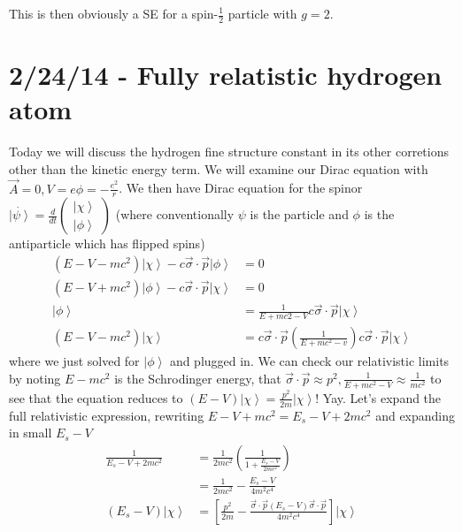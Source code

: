 \documentclass[10pt]{report}
\newcommand{\ket}[1]{\left|#1\right>}
\newcommand{\rd}[2]{\frac{d#1}{d#2}}
\begin{document}
This is then obviously a SE for a spin-$\frac{1}{2}$ particle with $g=2$. 

\chapter{2/24/14 - Fully relatistic hydrogen atom}

Today we will discuss the hydrogen fine structure constant in its other corretions other than the kinetic energy term. We will examine our Dirac equation with $\vec{A} = 0, V = e\phi = -\frac{e^2}{r}$. We then have Dirac equation for the spinor $\dot{\ket{\psi}} = \rd{}{t}\begin{pmatrix} \ket{\chi}\\ \ket{\phi} \end{pmatrix}$ (where conventionally $\psi$ is the particle and $\phi$ is the antiparticle which has flipped spins)
\begin{align}
    \left( E-V-mc^2 \right)\ket{\chi} - c\vec{\sigma}\cdot \vec{p}\ket{\phi} &= 0\\
    \left( E-V+mc^2 \right)\ket{\phi} - c\vec{\sigma}\cdot \vec{p}\ket{\chi} &= 0\\
    \ket{\phi} &= \frac{1}{E + mc2 - V}c\vec{\sigma}\cdot \vec{p}\ket{\chi}\\
    \left( E-V-mc^2 \right)\ket{\chi} &= c\vec{\sigma}\cdot \vec{p}\left( \frac{1}{E+mc^2-v} \right)c\vec{\sigma}\cdot \vec{p}\ket{\chi}
\end{align}
where we just solved for $\ket{\phi}$ and plugged in. We can check our relativistic limits by noting $E-mc^2$ is the Schrodinger energy, that $\vec{\sigma}\cdot \vec{p}\approx p^2, \frac{1}{E+mc^2-V} \approx \frac{1}{mc^2}$ to see that the equation reduces to $\left( E-V \right)\ket{\chi} = \frac{p^2}{2m}\ket{\chi}$! Yay. Let's expand the full relativistic expression, rewriting $E-V+mc^2 = E_s-V+2mc^2$ and expanding in small $E_s - V$
\begin{align}
    \frac{1}{E_s - V + 2mc^2} &= \frac{1}{2mc^2}\left( \frac{1}{1+\frac{E_s - V}{2mc^2}} \right)\\
    &= \frac{1}{2mc^2} - \frac{E_s - V}{4m^2c^4}\\
    \left( E_s - V \right)\ket{\chi} &= \left[ \frac{p^2}{2m} - \frac{\vec{\sigma}\cdot \vec{p}\left( E_s - V \right)\vec{\sigma}\cdot \vec{p}}{4m^2c^4} \right]\ket{\chi}
\end{align}
\end{document}
